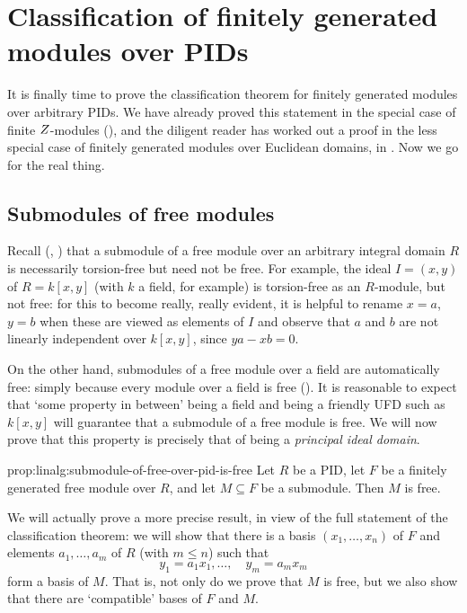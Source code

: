 \section{Classification of finitely generated modules over PIDs}
\label{sec:linalg:classification-of-finitely-generated-modules-over-pids}


It is finally time to prove the classification theorem for finitely
generated modules over arbitrary PIDs. We have already proved this
statement in the special case of finite $Z$-modules
(), and the diligent reader
has worked out a proof in the less special case of finitely generated
modules over Euclidean domains, in
. Now
we go for the real thing.

\subsection{Submodules of free modules}
\label{subsec:linalg:submodules-of-free-modules}
Recall (, ) that a submodule of a
free module over an arbitrary integral domain $R$ is necessarily
torsion-free but need not be free. For example, the ideal $I = (x,y)$
of $R = k[x,y]$ (with $k$ a field, for example) is torsion-free as an
$R$-module, but not free: for this to become really, really evident,
it is helpful to rename $x = a$, $y = b$ when these are viewed as
elements of $I$ and observe that $a$ and $b$ are not linearly
independent over $k[x,y]$, since $ya - xb = 0$.

On the other hand, submodules of a free module over a field are
automatically free: simply because every module over a field is free
(). It is reasonable to expect that `some property in
between' being a field and being a friendly UFD such as $k[x,y]$ will
guarantee that a submodule of a free module is free. We will now prove
that this property is precisely that of being a \emph{principal ideal
  domain}.
\begin{prop}{}{prop:linalg:submodule-of-free-over-pid-is-free}
  Let $R$ be a PID, let $F$ be a finitely generated free module over
  $R$, and let $M \subseteq F$ be a submodule. Then $M$ is free.
\end{prop}
We will actually prove a more precise result, in view of the full
statement of the classification theorem: we will show that there is a
basis $(x_1, \dots, x_n)$ of $F$ and elements $a_1, \dots, a_m$ of $R$
(with $m \leq n$) such that
\[
  y_1 = a_1 x_1, \dots, \quad y_m = a_m x_m
\]
form a basis of $M$. That is, not only do we prove that $M$ is free,
but we also show that there are `compatible' bases of $F$ and $M$.

